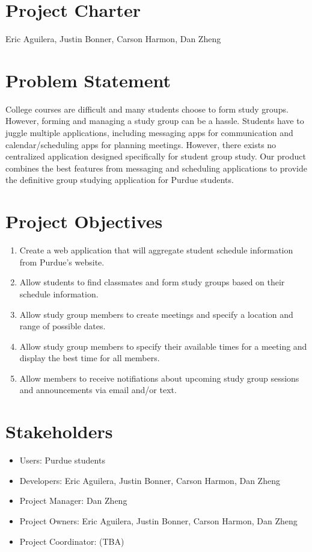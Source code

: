 \documentclass[12pt]{article}
\newcommand{\hwTitle}{Project Charter}
\newcommand{\authorName}{Eric Aguilera, Justin Bonner, Carson Harmon, Dan Zheng}
\begin{document}
\section*{\Large \centering \hwTitle}
{\centering \authorName \par}

\section{Problem Statement}

College courses are difficult and many students choose to form study groups. However, forming and managing a study group can be a hassle. Students have to juggle multiple applications, including messaging apps for communication and calendar/scheduling apps for planning meetings. However, there exists no centralized application designed specifically for student group study. Our product combines the best features from messaging and scheduling applications to provide the definitive group studying application for Purdue students.

\section{Project Objectives}
\begin{enumerate}[nolistsep]
    \item Create a web application that will aggregate student schedule information from Purdue's website.
    \item Allow students to find classmates and form study groups based on their schedule information.
    \item Allow study group members to create meetings and specify a location and range of possible dates.
    \item Allow study group members to specify their available times for a meeting and display the best time for all members.
    \item Allow members to receive notifiations about upcoming study group sessions and announcements via email and/or text.
\end{enumerate}

\section{Stakeholders}
\begin{itemize}[nolistsep]
    \item Users: Purdue students
    \item Developers: Eric Aguilera, Justin Bonner, Carson Harmon, Dan Zheng
    \item Project Manager: Dan Zheng
    \item Project Owners: Eric Aguilera, Justin Bonner, Carson Harmon, Dan Zheng
    \item Project Coordinator: (TBA)
\end{itemize}
\end{document}

